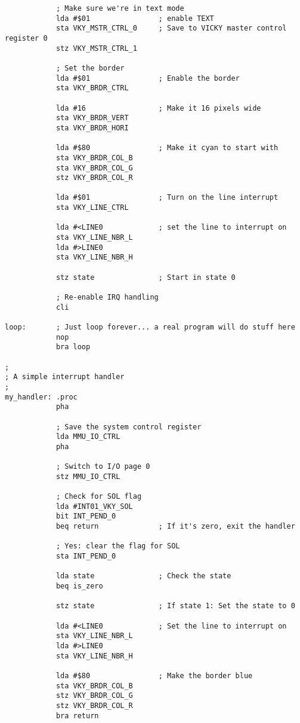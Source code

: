 \begin{verbatim}
            ; Make sure we're in text mode
            lda #$01                ; enable TEXT
            sta VKY_MSTR_CTRL_0     ; Save to VICKY master control register 0
            stz VKY_MSTR_CTRL_1

            ; Set the border
            lda #$01                ; Enable the border
            sta VKY_BRDR_CTRL

            lda #16                 ; Make it 16 pixels wide
            sta VKY_BRDR_VERT
            sta VKY_BRDR_HORI

            lda #$80                ; Make it cyan to start with
            sta VKY_BRDR_COL_B
            sta VKY_BRDR_COL_G
            stz VKY_BRDR_COL_R

            lda #$01                ; Turn on the line interrupt
            sta VKY_LINE_CTRL

            lda #<LINE0             ; set the line to interrupt on
            sta VKY_LINE_NBR_L
            lda #>LINE0
            sta VKY_LINE_NBR_H

            stz state               ; Start in state 0

            ; Re-enable IRQ handling
            cli

loop:       ; Just loop forever... a real program will do stuff here
            nop
            bra loop

;
; A simple interrupt handler
;
my_handler: .proc
            pha

            ; Save the system control register
            lda MMU_IO_CTRL
            pha

            ; Switch to I/O page 0
            stz MMU_IO_CTRL

            ; Check for SOL flag
            lda #INT01_VKY_SOL
            bit INT_PEND_0
            beq return              ; If it's zero, exit the handler

            ; Yes: clear the flag for SOL
            sta INT_PEND_0

            lda state               ; Check the state
            beq is_zero

            stz state               ; If state 1: Set the state to 0

            lda #<LINE0             ; Set the line to interrupt on
            sta VKY_LINE_NBR_L
            lda #>LINE0
            sta VKY_LINE_NBR_H

            lda #$80                ; Make the border blue
            sta VKY_BRDR_COL_B
            stz VKY_BRDR_COL_G
            stz VKY_BRDR_COL_R
            bra return


\end{verbatim}
